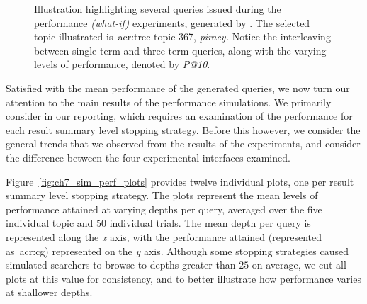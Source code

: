 \begin{figure}[t!]
    \centering
    \caption[Example queries issued]{Illustration highlighting several queries issued during the performance \emph{(what-if)} experiments, generated by . The selected topic illustrated is~\gls{acr:trec} topic 367, \emph{piracy.} Notice the interleaving between single term and three term queries, along with the varying levels of performance, denoted by \emph{P@10}.}
    \label{fig:ch7_example_queries}
\end{figure}

Satisfied with the mean performance of the generated queries, we now turn our attention to the main results of the performance simulations. We primarily consider  in our reporting, which requires an examination of the performance for each result summary level stopping strategy. Before this however, we consider the general trends that we observed from the results of the experiments, and consider the difference between the four experimental interfaces examined.

Figure~\ref{fig:ch7_sim_perf_plots} provides twelve individual plots, one per result summary level stopping strategy. The plots represent the mean levels of performance attained at varying depths per query, averaged over the five individual topic and 50 individual trials. The mean depth per query is represented along the \emph{x} axis, with the performance attained (represented as~\gls{acr:cg}) represented on the \emph{y} axis. Although some stopping strategies caused simulated searchers to browse to depths greater than $25$ on average, we cut all plots at this value for consistency, and to better illustrate how performance varies at shallower depths.

